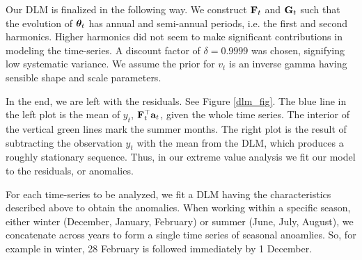 Our DLM is finalized in the following way. We construct $\mathbf{\bm{F}}_t$ and $\mathbf{\bm{G}}_t$ such that the evolution of $\mathbf{\bm{\theta}}_t$ has annual and semi-annual periods, i.e. the first and second harmonics. Higher harmonics did not seem to make significant contributions in modeling the time-series. A discount factor of $\delta=0.9999$ was chosen, signifying low systematic variance. We assume the prior for $v_t$ is an inverse gamma having sensible shape and scale parameters.

In the end, we are left with the residuals. See Figure \ref{dlm_fig}. The blue line in the left plot is the mean of $y_t$, $\mathbf{\bm{F}}_t^\top\mathbf{\bm{a}}_t$, given the whole time series. The interior of the vertical green lines mark the summer months. The right plot is the result of subtracting the observation $y_t$ with the mean from the DLM, which produces a roughly stationary sequence. Thus, in our extreme value analysis we fit our model to the residuals, or anomalies.

For each time-series to be analyzed, we fit a DLM having the characteristics described above to obtain the anomalies. When working within a specific season, either winter (December, January, February) or summer (June, July, August), we concatenate across years to form a single time series of seasonal anoamlies. So, for example in winter, 28 February is followed immediately by 1 December.
